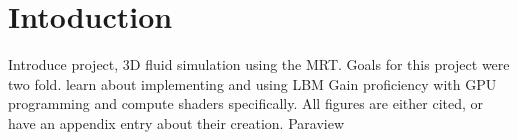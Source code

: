 \section{Intoduction}

\begin{outline}
\1 Introduce project, 3D fluid simulation using the MRT.
\1 Goals for this project were two fold.
\2 learn about implementing and using LBM
\2 Gain proficiency with GPU programming and compute shaders specifically.
\1 All figures are either cited, or have an appendix entry about their creation.
\1 Paraview
\end{outline}

